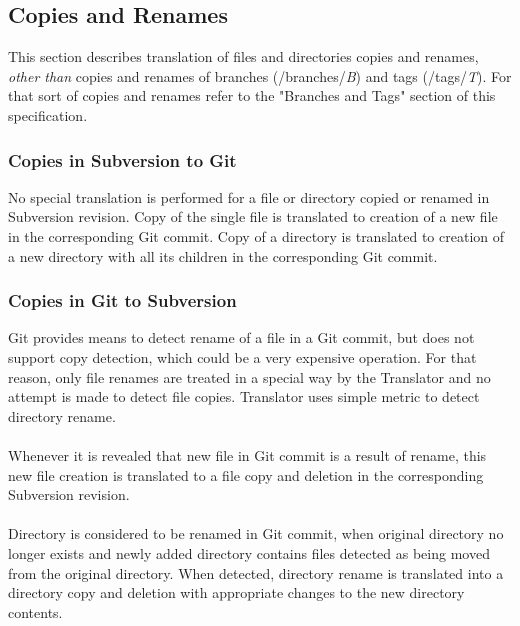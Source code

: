 \subsection{Copies and Renames}
This section describes translation of files and directories copies and renames, \emph{other than} copies and renames of 
branches (/branches/\emph{B}) and tags (/tags/\emph{T}). For that sort of copies and renames refer to the "Branches and Tags" 
section of this specification.

\subsubsection{Copies in Subversion to Git}
No special translation is performed for a file or directory copied or renamed in Subversion revision. Copy of the single file is translated 
to creation of a new file in the corresponding Git commit. Copy of a directory is translated to creation of a new directory with all its children
in the corresponding Git commit.

\subsubsection{Copies in Git to Subversion}
Git provides means to detect rename of a file in a Git commit, but does not support copy detection, which could be 
a very expensive operation. For that reason, only file renames are treated in a special way by the Translator and
no attempt is made to detect file copies. Translator uses simple metric to detect directory rename.\\\\
Whenever it is revealed that new file in Git commit is a result of rename, this new file creation is translated to a file copy and deletion in the 
corresponding Subversion revision.\\\\ 
Directory is considered to be renamed in Git commit, when original directory no longer exists and newly added directory contains
files detected as being moved from the original directory. When detected, directory rename is translated into a directory copy
and deletion with appropriate changes to the new directory contents.
